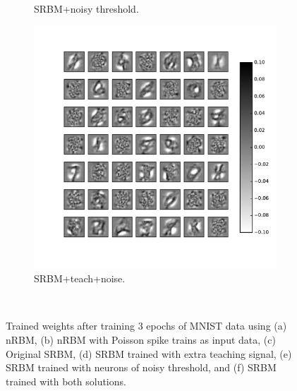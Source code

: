 \begin{figure}
\begin{subfigure}[t]{0.4\textwidth}
		\caption{SRBM+noisy threshold.}
	\end{subfigure}
	\begin{subfigure}[t]{0.4\textwidth}
		\includegraphics[width=\textwidth]{pics_sdlm/53_MNIST_SRBM_all/2_60000_0.pdf}
		\caption{SRBM+teach+noise.}
	\end{subfigure}\\
	\caption{Trained weights after training 3 epochs of MNIST data using (a) nRBM, (b) nRBM with Poisson spike trains as input data, (c) Original SRBM, (d) SRBM trained with extra teaching signal, (e) SRBM trained with neurons of noisy threshold, and (f) SRBM trained with both solutions.}
\end{figure}

